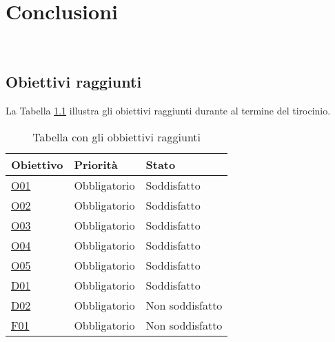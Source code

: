 \chapter{Conclusioni}
\label{cap:conclusioni}

\\

\section{Obiettivi raggiunti}
\label{sec:raggiungimento-obiettivi}

La Tabella \ref{tab:obbiettivi-raggiunti} illustra gli obiettivi raggiunti durante al termine del tirocinio.

\begin{table}
    \centering
    \begin{tabular}{|l|l|l|}
        \hline
        \textbf{Obiettivo} & \textbf{Priorità} & \textbf{Stato} \\ \hline
        \hyperref[O01]{O01}                & Obbligatorio      & Soddisfatto    \\ \hline
        \hyperref[O02]{O02}                & Obbligatorio      & Soddisfatto    \\ \hline
        \hyperref[O03]{O03}                & Obbligatorio      & Soddisfatto    \\ \hline
        \hyperref[O04]{O04}                & Obbligatorio      & Soddisfatto    \\ \hline
        \hyperref[O05]{O05}                & Obbligatorio      & Soddisfatto    \\ \hline
        \hyperref[D01]{D01}                & Obbligatorio      & Soddisfatto    \\ \hline
        \hyperref[D02]{D02}                & Obbligatorio      & Non soddisfatto    \\ \hline
        \hyperref[F01]{F01}                & Obbligatorio      & Non soddisfatto    \\ \hline
    \end{tabular}%
\caption{Tabella con gli obbiettivi raggiunti}
\label{tab:obbiettivi-raggiunti}
\end{table}

